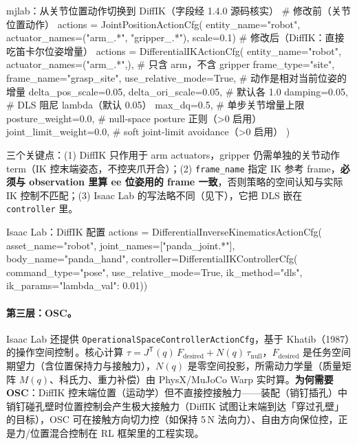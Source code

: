 \begin{codebox}[Python]{mjlab：从关节位置动作切换到 DiffIK（字段经 1.4.0 源码核实）}
# 修改前（关节位置动作）
actions = JointPositionActionCfg(
    entity_name="robot", actuator_names=("arm_.*", "gripper_.*"), scale=0.1)
# 修改后（DiffIK：直接吃笛卡尔位姿增量）
actions = DifferentialIKActionCfg(
    entity_name="robot",
    actuator_names=("arm_.*",),   # 只含 arm，不含 gripper
    frame_type="site", frame_name="grasp_site",
    use_relative_mode=True,       # 动作是相对当前位姿的增量
    delta_pos_scale=0.05, delta_ori_scale=0.05,  # 默认各 1.0
    damping=0.05,                 # DLS 阻尼 lambda（默认 0.05）
    max_dq=0.5,                   # 单步关节增量上限
    posture_weight=0.0,           # null-space posture 正则（>0 启用）
    joint_limit_weight=0.0,       # soft joint-limit avoidance（>0 启用）
)
\end{codebox}

三个关键点：(1) DiffIK 只作用于 arm actuators，gripper 仍需单独的关节动作 term（IK 控末端姿态，不控夹爪开合）；(2) \verb|frame_name| 指定 IK 参考 frame，\textbf{必须与 observation 里算 ee 位姿用的 frame 一致}，否则策略的空间认知与实际 IK 控制不匹配；(3) Isaac Lab 的写法略不同（见下），它把 DLS 嵌在 \verb|controller| 里。

\begin{codebox}[Python]{Isaac Lab：DiffIK 配置}
actions = DifferentialInverseKinematicsActionCfg(
    asset_name="robot", joint_names=["panda_joint.*"], body_name="panda_hand",
    controller=DifferentialIKControllerCfg(
        command_type="pose", use_relative_mode=True,
        ik_method="dls", ik_params={"lambda_val": 0.01}))
\end{codebox}

\paragraph{第三层：OSC。}Isaac Lab 还提供 \verb|OperationalSpaceControllerActionCfg|，基于 Khatib（1987）的操作空间控制\,\cite{khatib1987operational}。核心计算 $\tau = J^{\mathsf T}(q)\,F_{\text{desired}} + N(q)\,\tau_{\text{null}}$，$F_{\text{desired}}$ 是任务空间期望力（含位置保持力与接触力），$N(q)$ 是零空间投影，所需动力学量（质量矩阵 $M(q)$、科氏力、重力补偿）由 PhysX/MuJoCo Warp 实时算。\textbf{为何需要 OSC}：DiffIK 控末端位置（运动学）但不直接控接触力——装配（销钉插孔）中销钉碰孔壁时位置控制会产生极大接触力（DiffIK 试图让末端到达「穿过孔壁」的目标），OSC 可在接触方向切力控（如保持 5\,N 法向力）、自由方向保位控，正是力/位置混合控制在 RL 框架里的工程实现。

